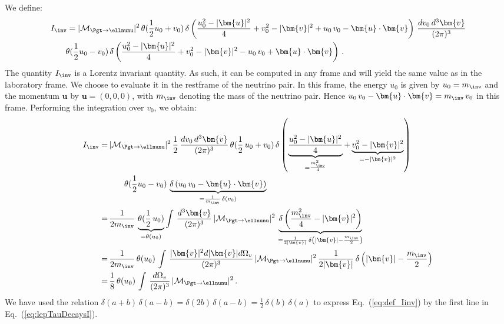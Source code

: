 We define:
\begin{align}
& \, I_{\inv} = \vert\mathcal{M}_{\Pgt \to
  \ellnunu}\vert^{2} \, \theta(\frac{1}{2} u_{0} + v_{0}) \, \delta
\left( \frac{u_{0}^{2} - \vert\bm{u}\vert^{2}}{4} + v_{0}^{2} - \vert\bm{v}\vert^{2} +
  u_{0} \, v_{0} - \bm{u} \cdot \bm{v} \right) \, 
  \frac{dv_{0} \, d^{3}\bm{v}}{(2\pi)^{3}} \nonumber \\
 & \qquad
  \theta(\frac{1}{2} u_{0}
  - v_{0}) \, \delta \left( \frac{u_{0}^{2} - \vert\bm{u}\vert^{2}}{4} +
    v_{0}^{2} - \vert\bm{v}\vert^{2} - u_{0} \, v_{0} + \bm{u}
    \cdot \bm{v} \right) \, .
\label{eq:def_Iinv}
\end{align}
The quantity $I_{\inv}$ is a Lorentz invariant quantity. 
As such, it can be computed in any frame and will yield the same value as in the laboratory frame.
We choose to evaluate it in the restframe of the neutrino pair.
In this frame, the energy $u_{0}$ is given by $u_{0} = m_{\inv}$ 
and the momentum $\bm{u}$ by $\bm{u} = ( 0, 0, 0 )$, with $m_{\inv}$ denoting
the mass of the neutrino pair.
Hence $u_{0} \, v_{0} - \bm{u} \cdot \bm{v} = m_{\inv} \, v_{0} $ in this frame.
Performing the integration over $v_{0}$, we obtain:
\begin{align}
I_{\inv}
= & \, \vert\mathcal{M}_{\Pgt \to
  \ellnunu}\vert^{2} \, \frac{1}{2} \, \frac{dv_{0} \, d^{3}\bm{v}}{(2\pi)^{3}} \, \theta ( \frac{1}{2} \, u_{0} + v_{0} ) \, 
    \delta \left( \underbrace{\frac{u_{0}^{2} - \vert\bm{u}\vert^{2}}{4}}_{=
        \frac{m^{2}_{\inv}}{4}} + \underbrace{v_{0}^{2} -
        \vert\bm{v}\vert^{2}}_{= -\vert\bm{v}\vert^{2}} \right)
    \nonumber \\
& \qquad
    \theta ( \frac{1}{2} u_{0} - v_{0} ) \, \underbrace{\delta \left(
        u_{0} \, v_{0} - \bm{u} \cdot \bm{v} \right)}_{= \frac{1}{m_{\inv}} \, \delta ( v_{0} )} \nonumber \\
= & \, \frac{1}{2 m_{\inv}} \, \underbrace{\theta ( \frac{1}{2} \, u_{0} )}_{= \theta ( u_{0} )} \int \, \frac{d^{3}\bm{v}}{(2\pi)^{3}} \, 
  \vert\mathcal{M}_{\Pgt \to
  \ellnunu}\vert^{2} \, \underbrace{\delta \left( \frac{m^{2}_{\inv}}{4} - \vert\bm{v}\vert^{2} \right)}_{
    = \frac{1}{2 \vert\bm{v}\vert} \, \delta \left( \vert\bm{v}\vert - \frac{m_{\inv}}{2} \right)} \nonumber \\
= & \, \frac{1}{2 m_{\inv}} \, \theta ( u_{0} ) \, \int \, \frac{\vert\bm{v}\vert^2 d\vert\bm{v}\vert d\Omega_{v}}{(2\pi)^{3}} \, 
  \vert\mathcal{M}_{\Pgt \to
  \ellnunu}\vert^{2} \, \frac{1}{2 \vert\bm{v}\vert} \, \delta \left( \vert\bm{v}\vert - \frac{m_{\inv}}{2} \right) \nonumber \\
= & \, \frac{1}{8} \, \theta ( u_{0} ) \, \int \, \frac{d\Omega_{v}}{(2\pi)^{3}} \, \vert\mathcal{M}_{\Pgt \to
  \ellnunu}\vert^{2} \, . 
\label{eq:lepTauDecaysI}
\end{align}
We have used the relation $\delta(a + b) \, \delta(a - b) = \delta(2b) \, \delta(a - b) = \frac{1}{2} \, \delta(b) \, \delta(a)$ 
to express Eq.~(\ref{eq:def_Iinv}) by the first line in Eq.~(\ref{eq:lepTauDecaysI}).

